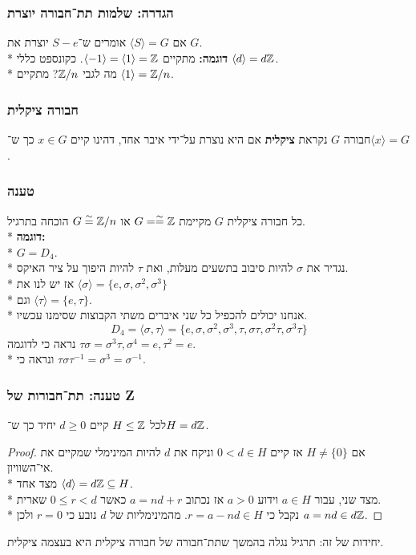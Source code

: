 \subsubsection{הגדרה: שלמות תת־חבורה יוצרת}
אם $\langle S \rangle = G$ אומרים ש־$S - e$ יוצרת את $G$. \\*
\textbf{דוגמה:}
מתקיים $\langle -1 \rangle = \langle 1 \rangle = \mathbb{Z}$. כקונספט כללי $\langle d \rangle = d\mathbb{Z}$. \\*
מה לגבי $\mathbb{Z}/n$? מתקיים $\langle 1 \rangle = \mathbb{Z}/n$.

\subsubsection{חבורה ציקלית}
חבורה $G$ נקראת \textbf{ציקלית} אם היא נוצרת על־ידי איבר אחד, דהינו קיים $x \in G$ כך ש־$\langle x \rangle = G$.

\subsubsection{טענה}
כל חבורה ציקלית $G$ מקיימת $G = \overset{\sim}{=} \mathbb{Z}$ או $G \overset{\sim}{=} \mathbb{Z}/n$ הוכחה בתרגיל. \\*
\textbf{דוגמה:} \\*
$G = D_4$. \\*
נגדיר את $\sigma$ להיות סיבוב בתשעים מעלות, ואת $\tau$ להיות היפוך על ציר האיקס. \\*
אז יש לנו את $\langle \sigma \rangle = \{e, \sigma, \sigma^2, \sigma^3\}$ \\*
וגם $\langle \tau \rangle = \{e, \tau\}$. \\*
אנחנו יכולים להכפיל כל שני איברים משתי הקבוצות שסימנו עכשיו.
\[
	D_4
	= \langle \sigma, \tau \rangle
	= \{e, \sigma, \sigma^2, \sigma^3,
	\tau, \sigma \tau, \sigma^2 \tau, \sigma^3 \tau \}
\]
נראה כי לדוגמה $\tau \sigma = \sigma^3 \tau, \sigma^4 = e, \tau^2 = e$. \\*
ונראה כי $\tau \sigma \tau^{-1} = \sigma^3 = \sigma^{-1}$.

\subsubsection{טענה: תת־חבורות של Z}
לכל $H \le \mathbb{Z}$ קיים $d \ge 0$ יחיד כך ש־$H = d \mathbb{Z}$.
\begin{proof}
	אם $H \ne \{0\}$ אז קיים $0 < d \in H$ וניקח את $d$ להיות המינימלי שמקיים את אי־השוויון. \\*
	מצד אחד $\langle d \rangle = d \mathbb{Z} \subseteq H$. \\*
	מצד שני, עבור $a \in H$ וידוע $a > 0$ אז נכתוב $a = nd + r$ כאשר $0 \le r < d$ שארית. \\*
	נקבל כי $r = a - nd \in H$. מהמינימליות של $d$ נובע כי $r = 0$ ולכן $a = nd \in d\mathbb{Z}$.
\end{proof}
יחידות של זה: תרגיל
נגלה בהמשך שתת־חבורה של חבורה ציקלית היא בעצמה ציקלית.

